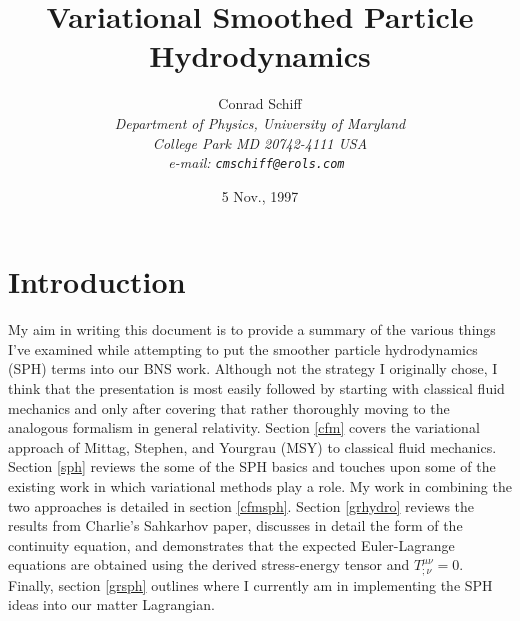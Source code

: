 


\title{Variational Smoothed Particle Hydrodynamics}
%
\author{   \sc
            Conrad Schiff\\
           \em
            Department of Physics, University of Maryland%
           \\ \em
            College Park MD 20742-4111 USA\\
           \rm
         e-mail: \tt cmschiff@erols.com
        }
\date{5 Nov., 1997}
% 
\maketitle

\section{Introduction}

My aim in writing this document is to provide a summary of the various things I've examined while attempting to put the smoother particle hydrodynamics (SPH) terms into our BNS work.  Although not the strategy I originally chose, I think that the presentation is most easily followed by starting with classical fluid mechanics and only after covering that rather thoroughly moving to the analogous formalism in general relativity.  Section \ref{cfm} covers the variational approach of Mittag, Stephen, and Yourgrau (MSY) \cite{MSY} to classical fluid mechanics.  Section \ref{sph} reviews the some of the SPH basics and touches upon some of the existing work in which variational methods play a role.  My work in combining the two approaches is detailed in section \ref{cfmsph}.  Section \ref{grhydro} reviews the results from Charlie's Sahkarhov paper, discusses in detail the form of the continuity equation, and demonstrates that the expected Euler-Lagrange equations are obtained using the derived stress-energy tensor and $T^{\mu\nu}_{;\nu} = 0$.  Finally, section \ref{grsph} outlines where I currently am in implementing the SPH ideas into our matter Lagrangian.

